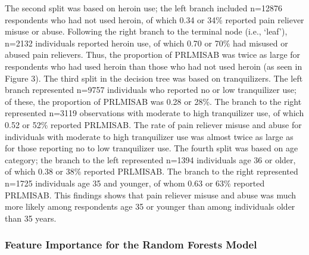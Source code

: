 \documentclass[sigconf]{acmart}
\begin{document}


The second split was based on heroin use; the left branch included n=12876 
respondents who had not used heroin, of which 0.34 or 34\% reported pain
reliever misuse or abuse. Following the right branch to the terminal node 
(i.e., `leaf'), n=2132 individuals reported heroin use, of which 0.70 or 
70\% had misused or abused pain relievers. Thus, the proportion of PRLMISAB 
was twice as large for respondents who had used heroin than those who had 
not used heroin (as seen in Figure 3). The third split in the decision tree
was based on tranquilizers. The left branch represented n=9757 individuals 
who reported no or low tranquilizer use; of these, the proportion of 
PRLMISAB was 0.28 or 28\%. The branch to the right represented n=3119 
observations with moderate to high tranquilizer use, of which 0.52 or 52\% 
reported PRLMISAB. The rate of pain reliever misuse and abuse for individuals 
with moderate to high tranquilizer use was almost twice as large as for 
those reporting no to low tranquilizer use. The fourth split was based on age 
category; the branch to the left represented n=1394 individuals age 36 or older, 
of which 0.38 or 38\% reported PRLMISAB. The branch to the right represented 
n=1725 individuals age 35 and younger, of whom 0.63 or 63\% reported PRLMISAB. 
This findings shows that pain reliever misuse and abuse was much more likely
among respondents age 35 or younger than among individuals older than 35 years. 



\subsubsection{Feature Importance for the Random Forests Model}
\end{document}
